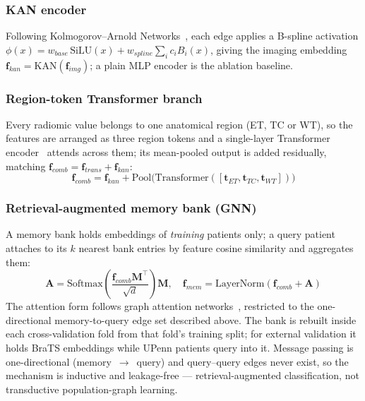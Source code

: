 \documentclass[conference]{IEEEtran}
\begin{document}
\subsubsection{KAN encoder}
Following Kolmogorov--Arnold Networks~\cite{liu2024kan}, each edge applies a B-spline activation $\phi(x)=w_{base}\,\text{SiLU}(x)+w_{spline}\sum_i c_i B_i(x)$, giving the imaging embedding $\mathbf{f}_{kan}=\text{KAN}(\mathbf{f}_{img})$; a plain MLP encoder is the ablation baseline.

\subsubsection{Region-token Transformer branch}
Every radiomic value belongs to one anatomical region (ET, TC or WT), so the features are arranged as three region tokens and a single-layer Transformer encoder~\cite{vaswani2017attention} attends across them; its mean-pooled output is added residually, matching $\mathbf{f}_{comb}=\mathbf{f}_{trans}+\mathbf{f}_{kan}$:
\begin{equation}
\mathbf{f}_{comb} = \mathbf{f}_{kan} + \text{Pool}\big(\text{Transformer}([\mathbf{t}_{ET},\mathbf{t}_{TC},\mathbf{t}_{WT}])\big)
\end{equation}

\subsubsection{Retrieval-augmented memory bank (GNN)}
A memory bank holds embeddings of \emph{training} patients only; a query patient attaches to its $k$ nearest bank entries by feature cosine similarity and aggregates them:
\begin{equation}
\mathbf{A} = \text{Softmax}\!\left(\frac{\mathbf{f}_{comb}\mathbf{M}^\top}{\sqrt{d}}\right)\mathbf{M}, \quad
\mathbf{f}_{mem} = \text{LayerNorm}(\mathbf{f}_{comb}+\mathbf{A})
\end{equation}
The attention form follows graph attention networks~\cite{velickovic2018gat}, restricted to the one-directional memory-to-query edge set described above. The bank is rebuilt inside each cross-validation fold from that fold's training split; for external validation it holds BraTS embeddings while UPenn patients query into it. Message passing is one-directional (memory~$\to$~query) and query--query edges never exist, so the mechanism is inductive and leakage-free --- retrieval-augmented classification, not transductive population-graph learning.
\end{document}
